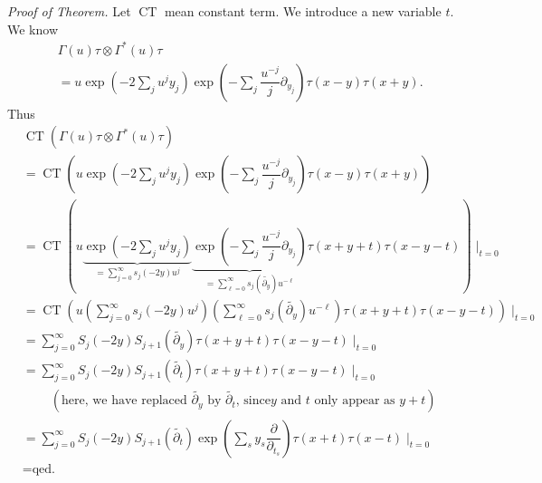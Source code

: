 \documentclass
[numbers=enddot,12pt,final,onecolumn,german,notitlepage]{scrartcl}%
\theoremstyle{definition}
\begin{document}
\textit{Proof of Theorem.} Let $\operatorname*{CT}$ mean constant term. We
introduce a new variable $t$. We know%
\begin{align*}
&  \Gamma\left(  u\right)  \tau\otimes\Gamma^{\ast}\left(  u\right)  \tau\\
&  =u\exp\left(  -2\sum\limits_{j}u^{j}y_{j}\right)  \exp\left(
-\sum\limits_{j}\dfrac{u^{-j}}{j}\partial_{y_{j}}\right)  \tau\left(
x-y\right)  \tau\left(  x+y\right)  .
\end{align*}
Thus%
\begin{align*}
&  \operatorname*{CT}\left(  \Gamma\left(  u\right)  \tau\otimes\Gamma^{\ast
}\left(  u\right)  \tau\right) \\
&  =\operatorname*{CT}\left(  u\exp\left(  -2\sum\limits_{j}u^{j}y_{j}\right)
\exp\left(  -\sum\limits_{j}\dfrac{u^{-j}}{j}\partial_{y_{j}}\right)
\tau\left(  x-y\right)  \tau\left(  x+y\right)  \right) \\
&  =\operatorname*{CT}\left(  u\underbrace{\exp\left(  -2\sum\limits_{j}%
u^{j}y_{j}\right)  }_{=\sum\limits_{j=0}^{\infty}s_{j}\left(  -2y\right)
u^{j}}\underbrace{\exp\left(  -\sum\limits_{j}\dfrac{u^{-j}}{j}\partial
_{y_{j}}\right)  }_{=\sum\limits_{\ell=0}^{\infty}s_{j}\left(
\widetilde{\partial_{y}}\right)  u^{-\ell}}\tau\left(  x+y+t\right)
\tau\left(  x-y-t\right)  \right)  \mid_{t=0}\\
&  =\operatorname*{CT}\left(  u\left(  \sum\limits_{j=0}^{\infty}s_{j}\left(
-2y\right)  u^{j}\right)  \left(  \sum\limits_{\ell=0}^{\infty}s_{j}\left(
\widetilde{\partial_{y}}\right)  u^{-\ell}\right)  \tau\left(  x+y+t\right)
\tau\left(  x-y-t\right)  \right)  \mid_{t=0}\\
&  =\sum\limits_{j=0}^{\infty}S_{j}\left(  -2y\right)  S_{j+1}\left(
\widetilde{\partial_{y}}\right)  \tau\left(  x+y+t\right)  \tau\left(
x-y-t\right)  \mid_{t=0}\\
&  =\sum\limits_{j=0}^{\infty}S_{j}\left(  -2y\right)  S_{j+1}\left(
\widetilde{\partial_{t}}\right)  \tau\left(  x+y+t\right)  \tau\left(
x-y-t\right)  \mid_{t=0}\\
&  \ \ \ \ \ \ \ \ \ \ \left(  \text{here, we have replaced }%
\widetilde{\partial_{y}}\text{ by }\widetilde{\partial_{t}}\text{, since
}y\text{ and }t\text{ only appear as }y+t\right) \\
&  =\sum\limits_{j=0}^{\infty}S_{j}\left(  -2y\right)  S_{j+1}\left(
\widetilde{\partial_{t}}\right)  \exp\left(  \sum\limits_{s}y_{s}%
\dfrac{\partial}{\partial_{t_{s}}}\right)  \tau\left(  x+t\right)  \tau\left(
x-t\right)  \mid_{t=0}\\
&  =\text{qed.}%
\end{align*}
\end{document}
